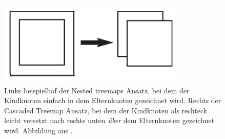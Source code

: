 \begin{figure}
    \centering
    \includegraphics[width=0.8\textwidth]{images/cascaded.png}
    \caption{Links beispielhaf der Nested treemaps Ansatz, bei dem der Kindknoten einfach in dem Elternknoten gezeichnet wird. Rechts der Cascaded Treemap Ansatz, bei dem der Kindknoten als rechteck leicht versetzt nach rechts unten \textit{über} dem Elternknoten gezeichnet wird. Abbildung aus \cite[3]{lu2008cascaded}.}
    \label{fig:cascaded}
\end{figure}

